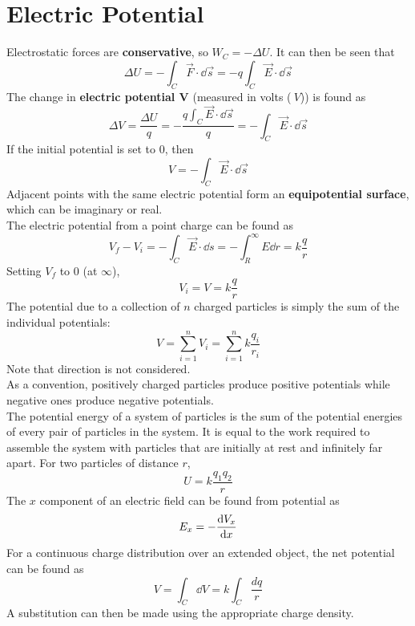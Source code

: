 \documentclass[./Electricity and Magnetism.tex]{subfiles}
\begin{document}
	\section{Electric Potential}
		Electrostatic forces are \textbf{conservative}, so \(W_C = -\Delta U\). It can then be seen that
			\[
				\Delta U = - \int_C \vec{F} \cdot \dd{\vec{s}} 
						= -q\int_C \vec{E} \cdot \dd{\vec{s}}
			\]	
		The change in \textbf{electric potential \(\bm{V}\)} (measured in volts (\(\SI{}{V}\))) is found as
			\[
				\Delta V = \frac{\Delta U}{q}
					= -\frac{q\int_C \vec{E} \cdot \dd{\vec{s}}}{q}
					= -\int_C \vec{E} \cdot \dd{\vec{s}}
			\]
			If the initial potential is set to 0, then
			\[V = -\int_C \vec{E} \cdot \dd{\vec{s}}\]
		Adjacent points with the same electric potential form an \textbf{equipotential surface}, which can be imaginary or real. \\
		The electric potential from a point charge can be found as
			\[
				V_f - V_i = -\int_C \vec{E} \cdot \dd{s}
					= -\int_R^\infty E \dd{r}
					= k\frac{q}{r}
			\]
			Setting \(V_f\) to 0 (at \(\infty\)),
			\[V_i = V = k\frac{q}{r}\]
		The potential due to a collection of \(n\) charged particles is simply the sum of the individual potentials:
			\[V = \sum_{i = 1}^n V_i = \sum_{i = 1}^n k\frac{q_i}{r_i} \tag{\(n\) charged particles}\]
			Note that direction is not considered. \\
			As a convention, positively charged particles produce positive potentials while negative ones produce negative potentials. \\
		The potential energy of a system of particles is the sum of the potential energies of every pair of particles in the system. It is equal to the work required to assemble the system with particles that are initially at rest and infinitely far apart. For two particles of distance \(r\),
			\[U = k\frac{q_1q_2}{r} \tag{2-particle system}\]
		The \(x\) component of an electric field can be found from potential as
			\[E_x = -\dv{V_x}{x}\]
		For a continuous charge distribution over an extended object, the net potential can be found as
			\[V = \int_C \dd{V} = k\int_C \frac{dq}{r}\]
			A substitution can then be made using the appropriate charge density.
\end{document}
